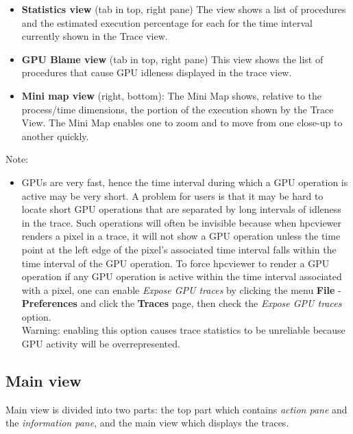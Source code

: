\documentclass[english]{article}
\begin{document}
\begin{itemize}
\item \textbf{Statistics view} (tab in top, right pane)
  The view shows a list of procedures and the estimated execution percentage for each for the time interval currently shown in the Trace view.

\item \textbf{GPU Blame view} (tab in top, right pane)
        This view shows the list of procedures that cause GPU idleness displayed in the trace view.


\item \textbf{Mini map view} (right, bottom):
  The Mini Map shows, relative to the process/time dimensions, the portion of the execution shown by the Trace View.
  The Mini Map enables one to zoom and to move from one close-up to another quickly.

\end{itemize}
Note:
\begin{itemize}
\item GPUs are very fast, hence the time interval during which a GPU operation is active may be very short. A problem for users is that it may be hard to locate short GPU operations that are separated by long intervals of idleness in the trace. Such operations will often be invisible because
 when hpcviewer renders a pixel in a trace, it will not show a GPU operation unless the time point at the left edge of the pixel's associated time interval falls within the time interval of the GPU operation.
        To force hpcviewer to render a GPU operation if any GPU operation is active within the time interval associated with a pixel, one can enable \emph{Expose GPU traces} by clicking the menu \textbf{File} - \textbf{Preferences} and click the \textbf{Traces} page, then check the \emph{Expose GPU traces} option.
\\
Warning: enabling this option causes trace statistics to be unreliable because GPU activity will be overrepresented.
\end{itemize}




\subsection{Main view}

Main view is divided into two parts: the top part which contains \emph{action pane} and the \emph{information pane}, and the main view which displays the traces.
\end{document}
